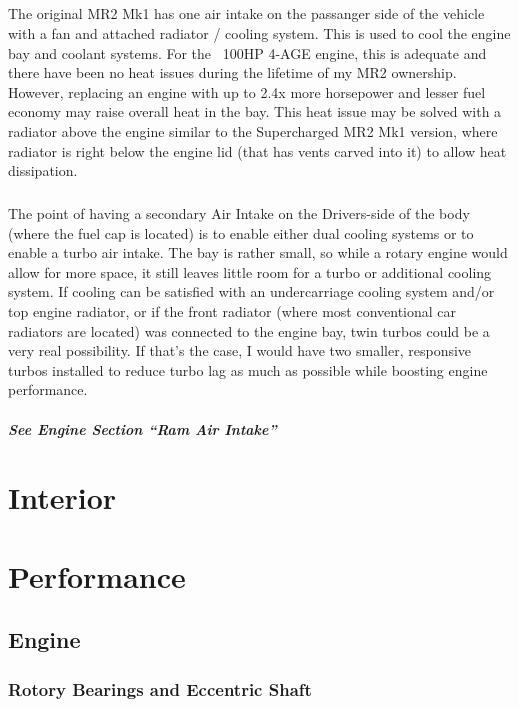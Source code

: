\documentclass[a4paper,10pt]{report}
\begin{document}
\paragraph*{}The original MR2 Mk1 has one air intake on the passanger side of the vehicle with a fan and attached radiator / cooling system. This is used to cool the engine bay and coolant systems. For the ~100HP 4-AGE engine, this is adequate and there have been no heat issues during the lifetime of my MR2 ownership. However, replacing an engine with up to 2.4x more horsepower and lesser fuel economy may raise overall heat in the bay. This heat issue may be solved with a radiator above the engine similar to the Supercharged MR2 Mk1 version, where radiator is right below the engine lid (that has vents carved into it) to allow heat dissipation. 
\paragraph*{}The point of having a secondary Air Intake on the Drivers-side of the body (where the fuel cap is located) is to enable either dual cooling systems or to enable a turbo air intake. The bay is rather small, so while a rotary engine would allow for more space, it still leaves little room for a turbo or additional cooling system. If cooling can be satisfied with an undercarriage cooling system and/or top engine radiator, or if the front radiator (where most conventional car radiators are located) was connected to the engine bay, twin turbos could be a very real possibility. If that's the case, I would have two smaller, responsive turbos installed to reduce turbo lag as much as possible while boosting engine performance.
\paragraph*{See Engine Section ``Ram Air Intake'' }



\chapter{Interior}
\chapter{Performance}
\section{Engine}
\subsection{Rotory Bearings and Eccentric Shaft} 
\end{document}

